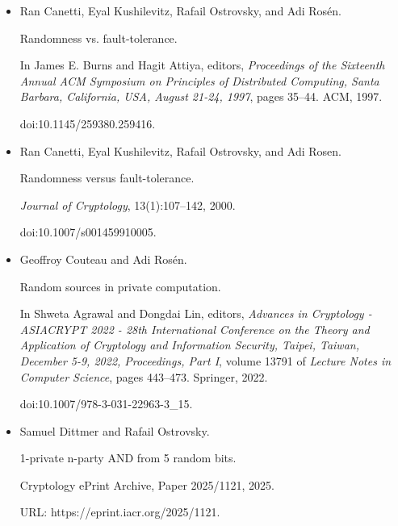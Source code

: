\begin{itemize}


\item[] 
[1]

Ran Canetti, Eyal Kushilevitz, Rafail Ostrovsky, and Adi Rosén.


Randomness vs. fault-tolerance.


In James E. Burns and Hagit Attiya, editors, \emph{Proceedings of the
Sixteenth Annual ACM Symposium on Principles of Distributed Computing,
Santa Barbara, California, USA, August 21-24, 1997}, pages 35–44. ACM,
1997.


doi:10.1145/259380.259416.





\item[] 
[2]

Ran Canetti, Eyal Kushilevitz, Rafail Ostrovsky, and Adi Rosen.


Randomness versus fault-tolerance.


\emph{Journal of Cryptology}, 13(1):107–142, 2000.


doi:10.1007/s001459910005.





\item[] 
[3]

Geoffroy Couteau and Adi Rosén.


Random sources in private computation.


In Shweta Agrawal and Dongdai Lin, editors, \emph{Advances in
Cryptology - ASIACRYPT 2022 - 28th International Conference on the Theory
and Application of Cryptology and Information Security, Taipei, Taiwan,
December 5-9, 2022, Proceedings, Part I}, volume 13791 of \emph{Lecture
Notes in Computer Science}, pages 443–473. Springer, 2022.


doi:10.1007/978-3-031-22963-3\_15.





\item[] 
[4]

Samuel Dittmer and Rafail Ostrovsky.


1-private n-party AND from 5 random bits.


Cryptology ePrint Archive, Paper 2025/1121, 2025.


URL: https://eprint.iacr.org/2025/1121.






\end{itemize}
